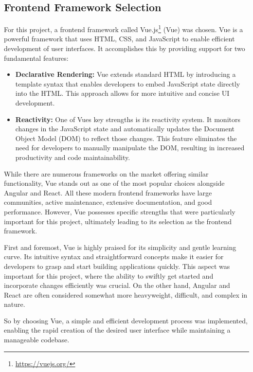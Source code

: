 \documentclass[a4paper,10pt]{report} %
\begin{document}
\subsection{Frontend Framework Selection}
For this project, a frontend framework called Vue.js\footnote{\url{https://vuejs.org/}} (Vue) was chosen. Vue is a powerful framework that uses HTML, CSS, and JavaScript to enable efficient development of user interfaces. It accomplishes this by providing support for two fundamental features:

\begin{itemize}
  \item \textbf{Declarative Rendering:} Vue extends standard HTML by introducing a template syntax that enables developers to embed JavaScript state directly into the HTML. This approach allows for more intuitive and concise UI development.

  \item \textbf{Reactivity:} One of Vues key strengths is its reactivity system. It monitors changes in the JavaScript state and automatically updates the Document Object Model (DOM) to reflect those changes. This feature eliminates the need for developers to manually manipulate the DOM, resulting in increased productivity and code maintainability. \cite{vuejs}
\end{itemize}

While there are numerous frameworks on the market offering similar functionality, Vue stands out as one of the most popular choices alongside Angular and React. All these modern frontend frameworks have large communities, active maintenance, extensive documentation, and good performance. However, Vue possesses specific strengths that were particularly important for this project, ultimately leading to its selection as the frontend framework.

First and foremost, Vue is highly praised for its simplicity and gentle learning curve. Its intuitive syntax and straightforward concepts make it easier for developers to grasp and start building applications quickly. This aspect was important for this project, where the ability to swiftly get started and incorporate changes efficiently was crucial. On the other hand, Angular and React are often considered somewhat more heavyweight, difficult, and complex in nature. \cite{KernComparing}

So by choosing Vue, a simple and efficient development process was implemented, enabling the rapid creation of the desired user interface while maintaining a manageable codebase.
\end{document}
